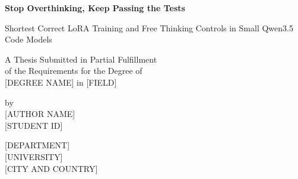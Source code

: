 \documentclass[11pt,letterpaper]{article}
\begin{document}
\setlength{\parskip}{10pt}
\onehalfspacing
{}
\begin{titlepage}\thispagestyle{plain}\centering\vspace*{1.2in}
{\LARGE\bfseries Stop Overthinking, Keep Passing the Tests\par}\bigskip
{\large Shortest Correct LoRA Training and Free Thinking Controls in Small Qwen3.5 Code Models\par}
\vspace{0.5in}A Thesis Submitted in Partial Fulfillment\\of the Requirements for the Degree of\\{}[DEGREE NAME] in [FIELD]\par
\vspace{0.4in}by\\{}[AUTHOR NAME]\\{}[STUDENT ID]\par
\vspace{0.5in}[DEPARTMENT]\\{}[UNIVERSITY]\\{}[CITY AND COUNTRY]\par{}\end{titlepage}
\setcounter{page}{2}
\end{document}

